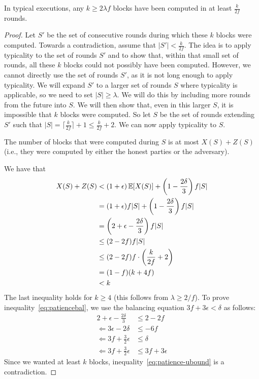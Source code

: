 \begin{lemma}
In typical executions, any $k \geq 2\lambda f$ blocks have been computed in at least $\frac{k}{2f}$ rounds.
\end{lemma}
\begin{proof}
Let $S'$ be the set of consecutive rounds during which these $k$ blocks were computed. Towards a contradiction, assume that $|S'| < \frac{k}{2f}$. The idea is to apply typicality to the set of rounds $S'$ and to show that, within that small set of rounds, all these $k$ blocks could not possibly have been computed. However, we cannot directly use the set of rounds $S'$, as it is not long enough to apply typicality. We will expand $S'$ to a larger set of rounds $S$ where typicality is applicable, so we need to set $|S| \geq \lambda$. We will do this by including more rounds from the future into $S$. We will then show that, even in this larger $S$, it is impossible that $k$ blocks were computed. So let $S$ be the set of rounds extending $S'$ such that $|S| = \lceil \frac{k}{2f} \rceil + 1 \leq \frac{k}{2f} + 2$. We can now apply typicality to $S$.

The number of blocks that were computed during $S$ is at most $X(S) + Z(S)$ (i.e., they were computed by either the honest parties or the adversary).

We have that
\begin{align}
    X(S) + Z(S) &< (1+\epsilon)\operatorname{\mathbb{E}}[X(S)] + \left(1 - \frac{2\delta}{3}\right)f|S|\\
    &=(1+\epsilon)f|S|+ \left(1 - \frac{2\delta}{3}\right)f|S|\\
    &= \left(2 + \epsilon - \frac{2\delta}{3}\right)f|S|\\
    &\leq (2-2f)f|S|\label{eq:patiencebal}\\
    & \leq (2-2f)f \cdot \left(\frac{k}{2f} + 2\right)\\
    & = (1-f)(k+4f) \\
    & < k\label{eq:patience-ubound}
\end{align}
The last inequality holds for $k \geq 4$ (this follows from $\lambda \geq 2/f$).
To prove inequality~\ref{eq:patiencebal}, we use the balancing equation $3f + 3\epsilon < \delta$ as follows:
\begin{align}
  2 + \epsilon - \frac{2\delta}{3} &\leq 2-2f\\
  \Leftarrow 3\epsilon - 2\delta &\leq -6f\\
  \Leftarrow 3f + \frac{3}{2}\epsilon &\leq \delta\\
  \Leftarrow 3f + \frac{3}{2}\epsilon &\leq 3f + 3\epsilon
\end{align}
Since we wanted at least $k$ blocks, inequality~\ref{eq:patience-ubound} is a contradiction.
\end{proof}

